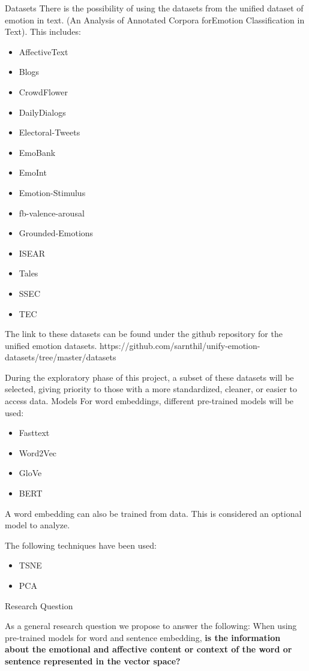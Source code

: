 Datasets
There is the possibility of using the datasets from the unified dataset of emotion in text. (An Analysis of Annotated Corpora forEmotion Classification in Text). This includes:
\begin{itemize}
  \item AffectiveText
  \item Blogs
  \item CrowdFlower
  \item DailyDialogs
  \item Electoral-Tweets
  \item EmoBank
  \item EmoInt
  \item Emotion-Stimulus
  \item fb-valence-arousal
  \item Grounded-Emotions
  \item ISEAR
  \item Tales
  \item SSEC
  \item TEC
\end{itemize}


The link to these datasets can be found under the github repository for the unified emotion datasets.
https://github.com/sarnthil/unify-emotion-datasets/tree/master/datasets

During the exploratory phase of this project, a subset of these datasets will be selected, giving priority to those with a more standardized, cleaner, or easier to access data.
Models
For word embeddings, different pre-trained models will be used:
\begin{itemize}
  \item Fasttext
  \item Word2Vec
  \item GloVe
  \item BERT
\end{itemize}

A word embedding can also be trained from data. This is considered an optional model to analyze.

The following techniques have been used:
\begin{itemize}
  \item TSNE
  \item PCA
\end{itemize}

Research Question

As a general research question we propose to answer the following:
When using pre-trained models for word and sentence embedding, \textbf{is the information about the emotional and affective content or context of the word or sentence represented in the vector space?}

